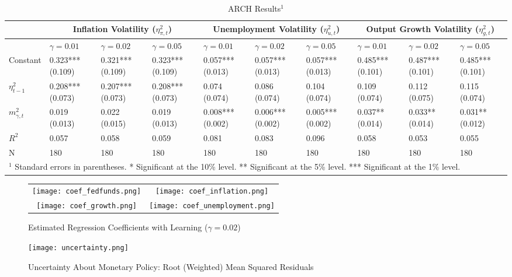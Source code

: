 \documentclass[12pt]{article}
\begin{document}
\begin{sidewaystable}\caption{ARCH Results$^1$}\label{tb:arch}
\begin{center}
\begin{tabular}{l|p{0.71in} p{0.71in} p{0.71in}|p{0.71in} p{0.71in} p{0.71in}|p{0.71in} p{0.71in} p{0.71in}}
 & \multicolumn{3}{c|}{Inflation Volatility ($\eta_{\pi,t}^2$)} & \multicolumn{3}{c|}{Unemployment Volatility ($\eta_{u,t}^2$)} &  \multicolumn{3}{c}{Output Growth Volatility ($\eta_{g,t}^2$)} \\ \hline
 & $\gamma=0.01$ & $\gamma=0.02$ & $\gamma=0.05$ & $\gamma=0.01$ & $\gamma=0.02$ & $\gamma=0.05$& $\gamma=0.01$ & $\gamma=0.02$ & $\gamma=0.05$ \\ \hline
Constant & 0.323*** (0.109) & 0.321*** (0.109) & 0.323*** (0.109) &  0.057*** (0.013) & 0.057*** (0.013) & 0.057*** (0.013) &  0.485*** (0.101) & 0.487*** (0.101) & 0.485*** (0.101) \\
$\eta_{t-1}^2$ & 0.208*** (0.073) & 0.207*** (0.073) & 0.208*** (0.073) &  0.074   (0.074) & 0.086   (0.074) & 0.104   (0.074) &  0.109   (0.074) & 0.112   (0.075) & 0.115   (0.074) \\
$m_{\gamma,t}^2$ & 0.019   (0.013) & 0.022   (0.015) & 0.019   (0.013) &  0.008*** (0.002) & 0.006*** (0.002) & 0.005*** (0.002) &  0.037** (0.014) & 0.033** (0.014) & 0.031** (0.012) \\ \hline
$R^2$ & 0.057 & 0.058 & 0.059 & 0.081 & 0.083 & 0.096 & 0.058 & 0.053 & 0.055 \\ 
N & 180 & 180 & 180 & 180 & 180 & 180 & 180 & 180 & 180 \\ \hline
\multicolumn{10}{p{8in}}{$^1$ Standard errors in parentheses.\newline
* Significant at the 10\% level.  ** Significant at the 5\% level.  *** Significant at the 1\% level.}\\ 
\end{tabular}
\end{center}
\end{sidewaystable}


\begin{figure}\caption{Estimated Regression Coefficients with Learning ($\gamma=0.02$)}\label{fg:coefs}
\begin{center}
\begin{tabular}{cc}
\texttt{[image: coef\_fedfunds.png]} & \texttt{[image: coef\_inflation.png]} \\ [1pc]
\texttt{[image: coef\_growth.png]} & \texttt{[image: coef\_unemployment.png]} \\
\end{tabular}
\end{center}
\end{figure}

\begin{figure}\caption{Uncertainty About Monetary Policy: Root (Weighted) Mean Squared Residuals}\label{fg:uncertain}
\begin{center}
\texttt{[image: uncertainty.png]}
\end{center}
\end{figure}
\end{document}
